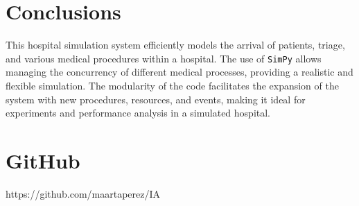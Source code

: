 \documentclass[a4paper,12pt]{article}
\begin{document}
\section{Conclusions}
This hospital simulation system efficiently models the arrival of patients, triage, and various medical procedures within a hospital. The use of \texttt{SimPy} allows managing the concurrency of different medical processes, providing a realistic and flexible simulation. The modularity of the code facilitates the expansion of the system with new procedures, resources, and events, making it ideal for experiments and performance analysis in a simulated hospital.
\section{GitHub}
https://github.com/maartaperez/IA
\end{document}
